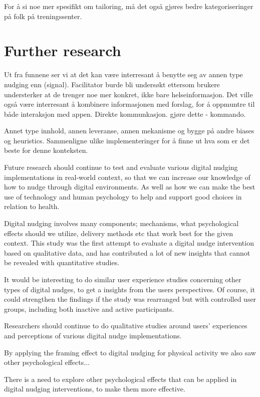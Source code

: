 For å si noe mer spesifikt om tailoring, må det også gjøres bedre kategoriseringer på folk på treningssenter. 

\section{Further research}

Ut fra funnene ser vi at det kan være interresant å benytte seg av annen type nudging enn (signal). Facilitator burde bli undersøkt ettersom brukere understerker at de trenger noe mer konkret, ikke bare helseinformasjon. 
Det ville også være interresant å kombinere informasjonen med forslag, for å oppmuntre til både interaksjon med appen. Direkte kommunkasjon. gjøre dette - kommando. 

Annet type innhold, annen leveranse, annen mekanisme og bygge på andre biases og heuristics. 
Sammenligne ulike implementeringer for å finne ut hva som er det beste for denne konteksten. 

Future research should continue to test and evaluate various digital nudging implementations in real-world context, so that we can increase our knowledge of how to nudge through digital environments. As well as how we can make the best use of technology and human psychology to help and support good choices in relation to health. 

Digital nudging involves many components; mechanisms, what psychological effects should we utilize, delivery methods etc that work best for the given context. This study was the first attempt to evaluate a digital nudge intervention based on qualitative data, and has contributed a lot of new insights that cannot be revealed with quantitative studies.

It would be interesting to do similar user experience studies concerning other types of digital nudges, to get a insights from the users perspectives. Of course, it could strengthen the findings if the study was rearranged but with controlled user groups, including both inactive and active participants.   

Researchers should continue to do qualitative studies around users' experiences and perceptions of various digital nudge implementations. 

By applying the framing effect to digital nudging for physical activity we also saw other psychological effects... 

There is a need to explore other psychological effects that can be applied in digital nudging interventions, to make them more effective.

